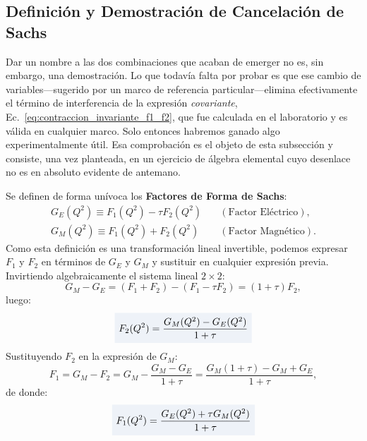 \documentclass[10pt,a4paper]{article}
\newcommand{\dest}[1]{{\setlength{\fboxsep}{4pt}\colorbox{colordest}{$\displaystyle #1$}}}
\begin{document}
\subsection{Definición y Demostración de Cancelación de Sachs}
Dar un nombre a las dos combinaciones que acaban de emerger no es, sin embargo, una demostración. Lo que todavía falta por probar es que ese cambio de variables---sugerido por un marco de referencia particular---elimina efectivamente el término de interferencia de la expresión \emph{covariante}, Ec.~\eqref{eq:contraccion_invariante_f1_f2}, que fue calculada en el laboratorio y es válida en cualquier marco. Solo entonces habremos ganado algo experimentalmente útil. Esa comprobación es el objeto de esta subsección y consiste, una vez planteada, en un ejercicio de álgebra elemental cuyo desenlace no es en absoluto evidente de antemano.

Se definen de forma unívoca los \textbf{Factores de Forma de Sachs}:
\begin{align}
\boxed{G_E(Q^2) \equiv F_1(Q^2) - \tau F_2(Q^2)} \quad & (\text{Factor Eléctrico}), \label{eq:GE_def} \\
\boxed{G_M(Q^2) \equiv F_1(Q^2) + F_2(Q^2)} \quad & (\text{Factor Magnético}). \label{eq:GM_def}
\end{align}
Como esta definición es una transformación lineal invertible, podemos expresar $F_1$ y $F_2$ en términos de $G_E$ y $G_M$ y sustituir en cualquier expresión previa. Invirtiendo algebraicamente el sistema lineal $2 \times 2$:
\begin{equation}
G_M - G_E = (F_1 + F_2) - (F_1 - \tau F_2) = (1 + \tau) F_2,
\end{equation}
luego:
\begin{equation}
\dest{F_2(Q^2) = \frac{G_M(Q^2) - G_E(Q^2)}{1 + \tau}}
\label{eq:F2_inverted}
\end{equation}
Sustituyendo $F_2$ en la expresión de $G_M$:
\begin{equation}
F_1 = G_M - F_2 = G_M - \frac{G_M - G_E}{1 + \tau} = \frac{G_M(1+\tau) - G_M + G_E}{1 + \tau},
\end{equation}
de donde:
\begin{equation}
\dest{F_1(Q^2) = \frac{G_E(Q^2) + \tau G_M(Q^2)}{1 + \tau}}
\label{eq:F1_inverted}
\end{equation}
\end{document}
